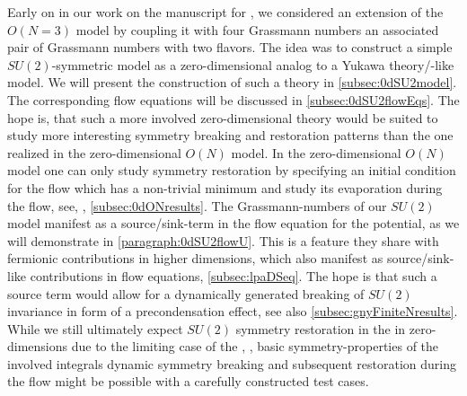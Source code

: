 Early on in our work on the manuscript for , we considered an extension of the $O(N=3)$ model by coupling it with four Grassmann numbers \dash{} an associated pair of Grassmann numbers with two flavors. 
The idea was to construct a simple $SU(2)$-symmetric model as a zero-dimensional analog to a Yukawa theory/\qm{}-like model.
We will present the construction of such a theory in \cref{subsec:0dSU2model}.
The corresponding \frg{} flow equations will be discussed in \cref{subsec:0dSU2flowEqs}.
The hope is, that such a more involved zero-dimensional theory would be suited to study more interesting symmetry breaking and restoration patterns than the one realized in the zero-dimensional $O(N)$ model.
In the zero-dimensional $O(N)$ model one can only study symmetry restoration by specifying an initial condition for the \frg{} flow which has a non-trivial minimum and study its evaporation during the \frg{} flow, see, \eg{}, \cref{subsec:0dONresults}.
The Grassmann-numbers of our $SU(2)$ model manifest as a source/sink-term in the flow equation for the \rgscaledependent{} potential, as we will demonstrate in \cref{paragraph:0dSU2flowU}.
This is a feature they share with fermionic contributions in higher dimensions, which also manifest as source/sink-like contributions in \lpa{} flow equations, \cf{} \cref{subsec:lpaDSeq}.
The hope is that such a source term would allow for a dynamically generated breaking of $SU(2)$ invariance in form of a precondensation effect, see also \cref{subsec:gnyFiniteNresults}.
While we still ultimately expect $SU(2)$ symmetry restoration in the \ir{} in zero-dimensions \dash{} due to the limiting case of the \cmwhTheoremWithRefs{}, \ie{}, basic symmetry-properties of the involved integrals \dash{} dynamic symmetry breaking and subsequent restoration during the \frg{} flow might be possible with a carefully constructed test cases.\bigskip

